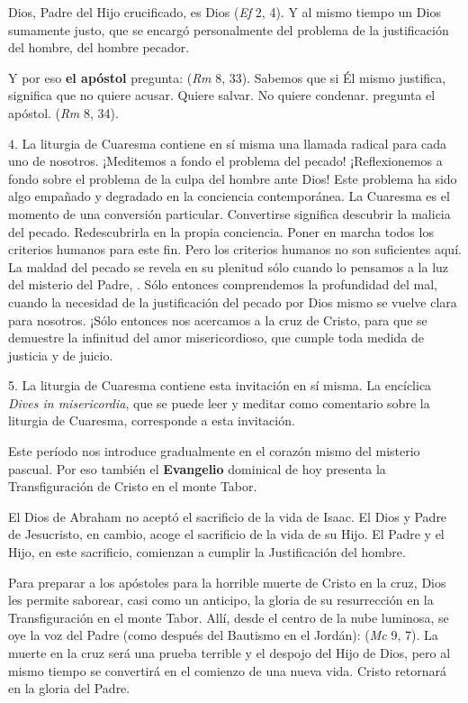 \begin{body}
Dios, Padre del Hijo crucificado, es Dios  (\textit{Ef} 2, 4). Y al mismo tiempo un Dios sumamente justo, que se encargó personalmente del problema de la justificación del hombre, del hombre pecador.

Y por eso \textbf{el apóstol} pregunta:  (\textit{Rm} 8, 33). Sabemos que si Él mismo justifica, significa que no quiere acusar. Quiere salvar. No quiere condenar.  pregunta el apóstol.  (\textit{Rm} 8, 34).

4. La liturgia de Cuaresma contiene en sí misma una llamada radical para cada uno de nosotros. ¡Meditemos a fondo el problema del pecado! ¡Reflexionemos a fondo sobre el problema de la culpa del hombre ante Dios! Este problema ha sido algo empañado y degradado en la conciencia contemporánea. La Cuaresma es el momento de una conversión particular. Convertirse significa descubrir la malicia del pecado. Redescubrirla en la propia conciencia. Poner en marcha todos los criterios humanos para este fin. Pero los criterios humanos no son suficientes aquí. La maldad del pecado se revela en su plenitud sólo cuando lo pensamos a la luz del misterio del Padre, . Sólo entonces comprendemos la profundidad del mal, cuando la necesidad de la justificación del pecado por Dios mismo se vuelve clara para nosotros. ¡Sólo entonces nos acercamos a la cruz de Cristo, para que se demuestre la infinitud del amor misericordioso, que cumple toda medida de justicia y de juicio.

5. La liturgia de Cuaresma contiene esta invitación en sí misma. La encíclica \textit{Dives in misericordia}, que se puede leer y meditar como comentario sobre la liturgia de Cuaresma, corresponde a esta invitación.

Este período nos introduce gradualmente en el corazón mismo del misterio pascual. Por eso también el \textbf{Evangelio} dominical de hoy presenta la Transfiguración de Cristo en el monte Tabor.

El Dios de Abraham no aceptó el sacrificio de la vida de Isaac. El Dios y Padre de Jesucristo, en cambio, acoge el sacrificio de la vida de su Hijo. El Padre y el Hijo, en este sacrificio, comienzan a cumplir la Justificación del hombre.

Para preparar a los apóstoles para la horrible muerte de Cristo en la cruz, Dios les permite saborear, casi como un anticipo, la gloria de su resurrección en la Transfiguración en el monte Tabor. Allí, desde el centro de la nube luminosa, se oye la voz del Padre (como después del Bautismo en el Jordán):  (\textit{Mc} 9, 7). La muerte en la cruz será una prueba terrible y el despojo del Hijo de Dios, pero al mismo tiempo se convertirá en el comienzo de una nueva vida. Cristo retornará en la gloria del Padre.



\end{body}

